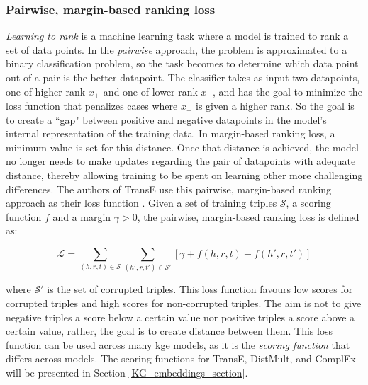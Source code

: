\subsubsection{Pairwise, margin-based ranking loss}
\textit{Learning to rank} is a machine learning task where a model is trained to rank a set of data points. In the \textit{pairwise} approach, the problem is approximated to a binary classification problem, so the task becomes to determine which data point out of a pair is the better datapoint. The classifier takes as input two datapoints, one of higher rank $x_{+}$ and one of lower rank $x_{-}$, and has the goal to minimize the loss function that penalizes cases where $x_{-}$ is given a higher rank. So the goal is to create a ``gap" between positive and negative datapoints in the model's internal representation of the training data. In margin-based ranking loss, a minimum value is set for this distance. Once that distance is achieved, the model no longer needs to make updates regarding the pair of datapoints with adequate distance, thereby allowing training to be spent on learning other more challenging differences.  The authors of TransE use this pairwise, margin-based ranking approach as their loss function \cite{TransE}. Given a set of training triples $\mathcal{S}$, a scoring function $f$ and a margin $\gamma > 0$, the pairwise, margin-based ranking loss is defined as:

\[\mathcal{L}=\sum_{(h, r, t) \in \mathcal{S}}\sum_{(h', r, t') \in \mathcal{S'}}[\gamma + f(h, r, t) - f(h', r, t')]\]

where $\mathcal{S'}$ is the set of corrupted triples. This loss function favours low scores for corrupted triples and high scores for non-corrupted triples. The aim is not to give negative triples a score below a certain value nor positive triples a score above a certain value, rather, the goal is to create distance between them. This loss function can be used across many \gls{kge} models, as it is the \textit{scoring function} that differs across models. The scoring functions for TransE, DistMult, and ComplEx will be presented in Section \ref{KG_embeddings_section}.


